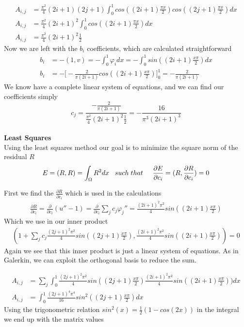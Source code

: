 \documentclass[a4paper,norsk]{article}
\begin{document}
\begin{align*}
A_{i,j} &= \frac{\pi^2}{4}(2i+1)(2j+1) \int_0^1 cos((2i+1)\frac{\pi x}{2}) cos((2j+1)\frac{\pi x}{2}) dx \\
A_{i,j} &= \frac{\pi^2}{4}(2i+1)^2 \int_0^1  cos((2i+1)\frac{\pi x}{2}) dx \\ 
A_{i,j} &= \frac{\pi^2}{4}(2i+1)^2 \frac{1}{2}
\end{align*}
Now we are left with the $b_i$ coefficients, which are calculated straightforward
\begin{align*}
b_i &= -(1,v) = -\int_0^1 \varphi_i dx = -\int_0^1 sin((2i+1)\frac{x\pi}{2}) dx \\
b_i &= - \Big[-\frac{2}{\pi(2i+1)}cos((2i+1)\frac{x\pi}{2})  \Big]_0^1 = -\frac{2}{\pi(2i+1)}
\end{align*}
We know have a complete linear system of equations, and we can find our coefficients simply \newline
\[ c_j = \frac{-\frac{2}{\pi(2i+1)} }{ \frac{\pi^2}{4}(2i+1)^2 \frac{1}{2}} = - \frac{16}{\pi^3(2i+1)^3}  \] \\

\textbf{Least Squares}\\
Using the least squares method our goal is to minimize the square norm of the residual $R$ 
\[ E = (R,R) = \int_\Omega R^2 dx \hspace{3mm} such\hspace{1mm} that \hspace{5mm} 
\frac{\partial E}{\partial c_i} = (R, \frac{\partial R}{\partial c_i} ) = 0\]

First we find the $ \frac{\partial R}{\partial c_i} $ which is used in the calculations
\begin{align*}
\frac{\partial R}{\partial c_i} = \frac{\partial}{\partial c_i} (u'' - 1) = 
\frac{\partial}{\partial c_i}  \sum\limits_{j} c_j \varphi_j'' =
\frac{(2i+1)^2\pi^2}{4} sin((2i+1)\frac{x\pi}{2}) 
\end{align*}
Which we use in our inner product
\begin{align*}
(1 +  \sum\limits_{j} c_j \frac{(2j+1)^2\pi^2}{4} sin((2j+1)\frac{x\pi}{2}),
						  \frac{(2i+1)^2\pi^2}{4} sin((2i+1)\frac{x\pi}{2})) = 0
\end{align*}
Again we see that this inner product is just a linear system of equations. As in Galerkin, we can exploit the orthogonal basis to reduce the sum. 

\begin{align*}
A_{i,j} &= \sum\limits_{j} \int_0^1 \frac{(2j+1)^2\pi^2}{4} sin((2j+1)\frac{x\pi}{2})
						  \frac{(2i+1)^2\pi^2}{4} sin((2i+1)\frac{x\pi}{2})) dx \\
A_{i,j} &= \int_0^1 \frac{(2j+1)^4\pi^4}{16} sin^2((2j+1)\frac{x\pi}{2}) dx 
\end{align*}
Using the trigonometric relation $sin^2(x) = \frac{1}{2} (1 - cos(2x))$ in the integral we end up with the matrix values
\end{document}
